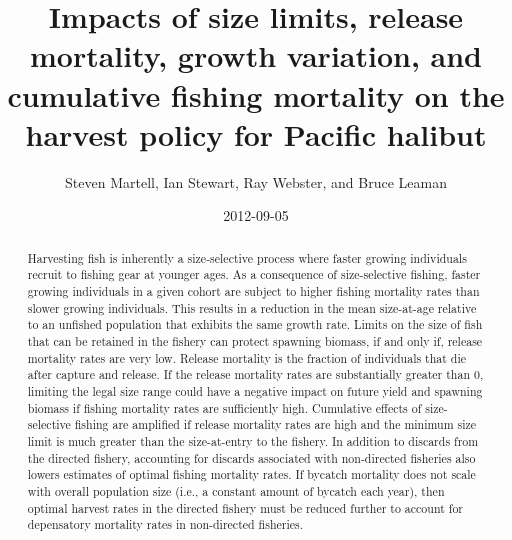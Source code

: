 \documentclass[12pt]{article}
\title{Impacts of size limits, release mortality, growth variation, and cumulative fishing mortality on the harvest policy for Pacific halibut}
\author{ Steven Martell, Ian Stewart, Ray Webster, and Bruce Leaman }
\date{2012-09-05}
\begin{document}
\ifpdf
{}
\else
{}
\fi


\maketitle

\begin{abstract}
	Harvesting fish is inherently a size-selective process where faster growing individuals recruit to fishing gear at younger ages.  As a consequence of size-selective fishing, faster growing individuals in a given cohort are subject to higher fishing mortality rates than slower growing individuals.  This results in a reduction in the mean size-at-age relative to an unfished population that exhibits the same growth rate.  Limits on the size of fish that can be retained in the fishery can protect spawning biomass, if and only if, release mortality rates are very low.  Release mortality is the fraction of individuals that die after capture and release.  If the release mortality rates are substantially greater than 0, limiting the legal size range could have a negative impact on future yield and spawning biomass if fishing mortality rates are sufficiently high.   Cumulative effects of size-selective fishing are amplified if release mortality rates are high and the minimum size limit is much greater than the size-at-entry to the fishery.  In addition to discards from the directed fishery, accounting for discards associated with non-directed fisheries also lowers estimates of optimal fishing mortality rates.  If bycatch mortality does not scale with overall population size (i.e., a constant amount of bycatch each year), then optimal harvest rates in the directed fishery must be reduced further to account for depensatory mortality rates in non-directed fisheries. 
	
\end{abstract}









\appendix

%
\end{document}
